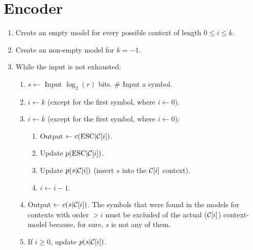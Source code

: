 \section{Encoder}
\begin{enumerate}
\item Create an empty model for every possible context of length $0\le i \le k$.
\item Create an non-empty model for $k=-1$.
\item While the input is not exhausted:
  \begin{enumerate}
  \item $s\leftarrow$ Input ${\log_2(r)}$ bits. \# Input a symbol.
  \item $i\leftarrow k$ (except for the first symbol, where
    $i\leftarrow 0$).
  \item $i\leftarrow k$ (except for the first symbol, where
    $i\leftarrow 0$):
    \begin{enumerate}
    \item Output $\leftarrow c(\text{ESC}|{\cal C}[i])$.
    \item Update $p(\text{ESC}|{\cal C}[i])$.
    \item Update $p(s|{\cal C}[i])$ (insert $s$ into the ${\cal C}[i]$ context).
    \item $i\leftarrow i-1$.
    \end{enumerate}
  \item Output $\leftarrow c(s|{\cal C}[i])$. The symbols that were found in the models for
       contexts with order $>i$ must be excluded of the actual (${\cal C}[i]$) context-model because, for sure, $s$ is not any of them.
  \item If $i\ge 0$, update $p(s|{\cal C}[i])$.
  \end{enumerate}
\end{enumerate}


